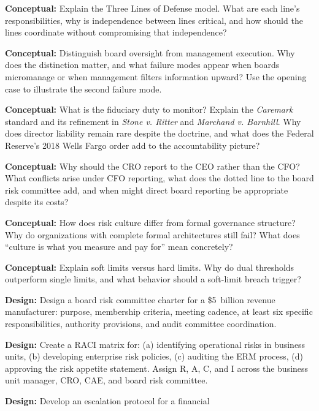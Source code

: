 \documentclass[11pt,openany]{book}
\begin{document}
\begin{discussionquestions}
\item \textbf{Conceptual:} Explain the Three Lines of Defense model. What
  are each line's responsibilities, why is independence between lines
  critical, and how should the lines coordinate without compromising that
  independence?
\item \textbf{Conceptual:} Distinguish board oversight from management
  execution. Why does the distinction matter, and what failure modes appear
  when boards micromanage or when management filters information upward? Use
  the opening case to illustrate the second failure mode.
\item \textbf{Conceptual:} What is the fiduciary duty to monitor? Explain
  the \emph{Caremark} standard and its refinement in \emph{Stone v. Ritter}
  and \emph{Marchand v. Barnhill}. Why does director liability remain rare
  despite the doctrine, and what does the Federal Reserve's 2018 Wells Fargo
  order add to the accountability picture?
\item \textbf{Conceptual:} Why should the CRO report to the CEO rather than
  the CFO? What conflicts arise under CFO reporting, what does the dotted
  line to the board risk committee add, and when might direct board
  reporting be appropriate despite its costs?
\item \textbf{Conceptual:} How does risk culture differ from formal
  governance structure? Why do organizations with complete formal
  architectures still fail? What does ``culture is what you measure and pay
  for'' mean concretely?
\item \textbf{Conceptual:} Explain soft limits versus hard limits. Why do
  dual thresholds outperform single limits, and what behavior should a
  soft-limit breach trigger?
\item \textbf{Design:} Design a board risk committee charter for a
  \$5~billion revenue manufacturer: purpose, membership criteria, meeting
  cadence, at least six specific responsibilities, authority provisions, and
  audit committee coordination.
\item \textbf{Design:} Create a RACI matrix for: (a) identifying operational
  risks in business units, (b) developing enterprise risk policies, (c)
  auditing the ERM process, (d) approving the risk appetite statement.
  Assign R, A, C, and I across the business unit manager, CRO, CAE, and
  board risk committee.
\item \textbf{Design:} Develop an escalation protocol for a financial

\end{discussionquestions}
\end{document}
